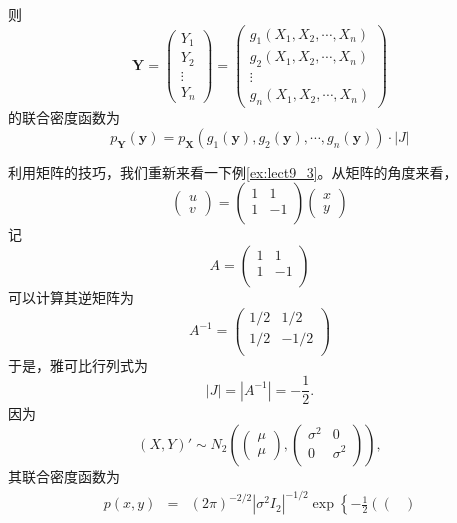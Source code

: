 则 $$\bm{Y}=\begin{pmatrix}
Y_1\\
Y_2\\
\vdots\\
Y_n
\end{pmatrix}=
\begin{pmatrix}
g_1(X_1,X_2,\cdots,X_n)\\
g_2(X_1,X_2,\cdots,X_n)\\
\vdots\\
g_n(X_1,X_2,\cdots,X_n) 
\end{pmatrix}$$
的联合密度函数为
$$p_{\bm{Y}}\left(\bm{y}\right)=p_{\bm{X}}\left(
g_1(\bm{y}),g_2(\bm{y}),\cdots,g_n(\bm{y})\right) \cdot|J|$$

\begin{example}
利用矩阵的技巧，我们重新来看一下例\ref{ex:lect9_3}。从矩阵的角度来看，
$$
\begin{pmatrix}
    u\\
    v
\end{pmatrix}
=\begin{pmatrix}
    1& 1\\
    1 & -1\\
\end{pmatrix}
\begin{pmatrix}
    x\\
    y
\end{pmatrix}
$$
记$$A = \begin{pmatrix}
    1& 1\\
    1 & -1\\
\end{pmatrix}$$
可以计算其逆矩阵为
$$
A^{-1} = \begin{pmatrix}
    1/2 & 1/2\\
    1/2 & -1/2\\
\end{pmatrix}
$$
于是，雅可比行列式为
$$
|J| = |A^{-1}| = -\frac{1}{2}.
$$
因为$$(X,Y)'\sim N_2\left(
\begin{pmatrix}
\mu \\ \mu    
\end{pmatrix},
\begin{pmatrix}
\sigma^2 & 0 \\ 0 & \sigma^2\\    
\end{pmatrix}
\right),$$其联合密度函数为
\begin{eqnarray*}
    p(x,y) &=& (2\pi)^{-2/2} |\sigma^2 I_2|^{-1/2}\exp\left\{-\frac{1}{2} \left(\begin{pmatrix}

\end{pmatrix}
\end{eqnarray*}
\end{example}
